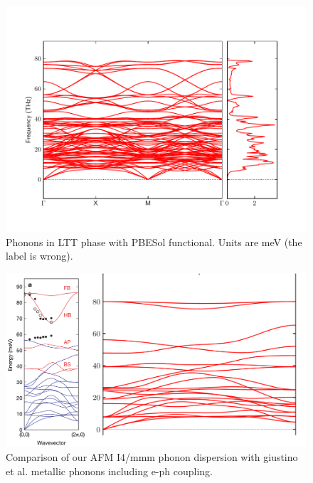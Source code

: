 \begin{figure}
    \centering
    \includegraphics[width=\textwidth]{fig/simulation/band_dos_ltt.pdf}
    \caption[LTT Phonons (PBESol)]{Phonons in LTT phase with PBESol functional. Units are meV (the label is wrong).}
    \label{fig:ltt_ps}
\end{figure}

\begin{figure}
    \centering
    \includegraphics[width=\textwidth]{fig/simulation/giu_compare.png}
    \caption{Comparison of our AFM I4/mmm phonon dispersion with giustino et al. metallic phonons including e-ph coupling.}
    \label{fig:giu_compare}
\end{figure}



